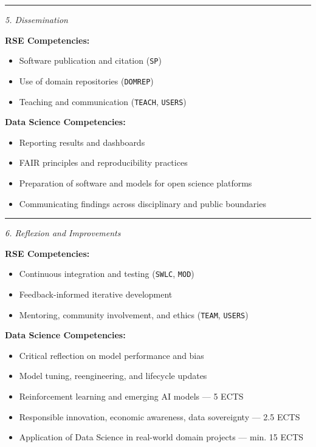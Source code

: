 \documentclass[
        english,biblatex
    ]{lni}
\providecommand{\tightlist}{%
    \setlength{\itemsep}{0pt}\setlength{\parskip}{0pt}}
\begin{document}
    \begin{center}\rule{0.5\linewidth}{0.5pt}\end{center}

    \emph{5. Dissemination}

    \textbf{RSE Competencies:}

    \begin{itemize}
    \tightlist
    \item
      Software publication and citation (\texttt{SP})
    \item
      Use of domain repositories (\texttt{DOMREP})
    \item
      Teaching and communication (\texttt{TEACH}, \texttt{USERS})
    \end{itemize}

    \textbf{Data Science Competencies:}

    \begin{itemize}
    \tightlist
    \item
      Reporting results and dashboards
    \item
      FAIR principles and reproducibility practices
    \item
      Preparation of software and models for open science platforms
    \item
      Communicating findings across disciplinary and public boundaries
    \end{itemize}

    \begin{center}\rule{0.5\linewidth}{0.5pt}\end{center}

    \emph{6. Reflexion and Improvements}

    \textbf{RSE Competencies:}

    \begin{itemize}
    \tightlist
    \item
      Continuous integration and testing (\texttt{SWLC}, \texttt{MOD})
    \item
      Feedback-informed iterative development
    \item
      Mentoring, community involvement, and ethics (\texttt{TEAM},
      \texttt{USERS})
    \end{itemize}

    \textbf{Data Science Competencies:}

    \begin{itemize}
    \tightlist
    \item
      Critical reflection on model performance and bias
    \item
      Model tuning, reengineering, and lifecycle updates
    \item
      Reinforcement learning and emerging AI models --- 5 ECTS
    \item
      Responsible innovation, economic awareness, data sovereignty ---
      2.5 ECTS
    \item
      Application of Data Science in real-world domain projects --- min.
      15 ECTS
    \end{itemize}
\end{document}
